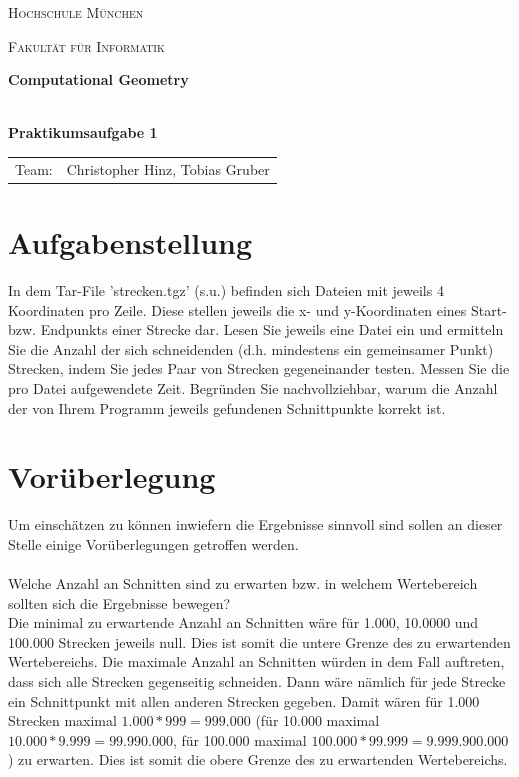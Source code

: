 \documentclass[12pt]{scrartcl}
\begin{document}
\begin{titlepage}
    \vfill
	\centering
	{\scshape\LARGE Hochschule München \par}
    {\scshape\Large Fakultät für Informatik \par}
	\vspace{1.5cm}

    


    \vfill
	{\LARGE\bfseries Computational Geometry\\~\\ \par}
	{\LARGE\bfseries Praktikumsaufgabe 1\par}
	\vfill
    \vfill


    \begin{tabular}{ll}
    \normalsize
    Team:  & Christopher Hinz, Tobias Gruber\\
    \end{tabular}

	\vfill

\end{titlepage}

\newpage



\raggedright


\section{Aufgabenstellung}
In dem Tar-File 'strecken.tgz' (s.u.) befinden sich Dateien mit jeweils 4 Koordinaten pro Zeile. 
Diese stellen jeweils die x- und y-Koordinaten eines Start- bzw. Endpunkts einer Strecke dar. 
Lesen Sie jeweils eine Datei ein und ermitteln Sie die Anzahl der sich schneidenden 
(d.h. mindestens ein gemeinsamer Punkt) Strecken, indem Sie jedes Paar von Strecken gegeneinander testen. 
Messen Sie die pro Datei aufgewendete Zeit. Begründen Sie nachvollziehbar, warum die Anzahl der von Ihrem Programm 
jeweils gefundenen Schnittpunkte korrekt ist.

\section{Vorüberlegung}

Um einschätzen zu können inwiefern die Ergebnisse sinnvoll sind sollen an dieser Stelle einige Vorüberlegungen getroffen werden.\\~\\
Welche Anzahl an Schnitten sind zu erwarten bzw. in welchem Wertebereich sollten sich die Ergebnisse bewegen?\\
Die minimal zu erwartende Anzahl an Schnitten wäre für 1.000, 10.0000 und 100.000 Strecken jeweils null. 
Dies ist somit die untere Grenze des zu erwartenden Wertebereichs. 
Die maximale Anzahl an Schnitten würden in dem Fall auftreten, dass sich alle Strecken gegenseitig schneiden. 
Dann wäre nämlich für jede Strecke ein Schnittpunkt mit allen anderen Strecken gegeben.
Damit wären für 1.000 Strecken maximal $1.000*999 = 999.000$ (für 10.000 maximal $10.000*9.999 = 99.990.000$, 
für 100.000 maximal $100.000*99.999 = 9.999.900.000$) zu erwarten.
Dies ist somit die obere Grenze des zu erwartenden Wertebereichs. 
\end{document}
